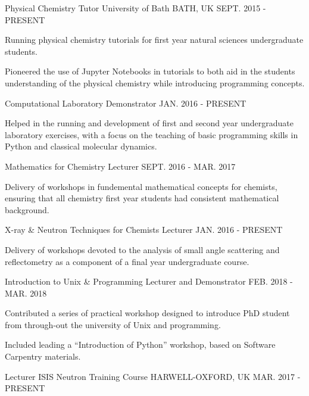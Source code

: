 \begin{cventries}
	\cventry
	{Physical Chemistry Tutor}
	{University of Bath}
	{BATH, UK}
	{SEPT. 2015 - PRESENT}
	{
		\begin{cvitems}
			\item {Running physical chemistry tutorials for first year natural sciences undergraduate students.}
			\item {Pioneered the use of Jupyter Notebooks in tutorials to both aid in the students understanding of the physical chemistry while introducing programming concepts.}
		\end{cvitems}
	}
	\cventry
	{Computational Laboratory Demonstrator}
	{}
	{}
	{JAN. 2016 - PRESENT}
	{
		\begin{cvitems}
			\item {Helped in the running and development of first and second year undergraduate laboratory exercises, with a focus on the teaching of basic programming skills in Python and classical molecular dynamics.}
		\end{cvitems}
	}
	\cventry
	{Mathematics for Chemistry Lecturer}
	{}
	{}
	{SEPT. 2016 - MAR. 2017}
	{
		\begin{cvitems}
			\item {Delivery of workshops in fundemental mathematical concepts for chemists, ensuring that all chemistry first year students had consistent mathematical background.}
		\end{cvitems}
	}
	\cventry
	{X-ray \& Neutron Techniques for Chemists Lecturer}
	{}
	{}
	{JAN. 2016 - PRESENT}
	{
		\begin{cvitems}
			\item {Delivery of workshops devoted to the analysis of small angle scattering and reflectometry as a component of a final year undergraduate course.}
		\end{cvitems}
	}
	\cventry
	{Introduction to Unix \& Programming Lecturer and Demonstrator}
	{}
	{}
	{FEB. 2018 - MAR. 2018}
	{
		\begin{cvitems}
			\item {Contributed a series of practical workshop designed to introduce PhD student from through-out the university of Unix and programming.}
			\item {Included leading a ``Introduction of Python'' workshop, based on Software Carpentry materials. }
		\end{cvitems}
	}
	\cventry
	{Lecturer}
	{ISIS Neutron Training Course}
	{HARWELL-OXFORD, UK}
	{MAR. 2017 - PRESENT}
	{
		\begin{cvitems}

\end{cvitems}}
\end{cventries}
